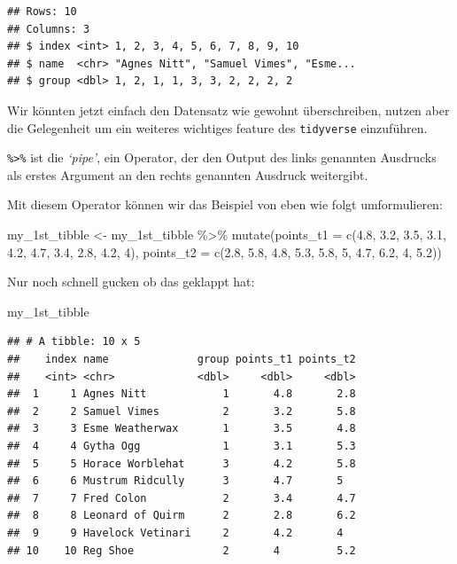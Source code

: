 \documentclass[
]{book}
\newenvironment{Shaded}{\begin{snugshade}}{\end{snugshade}}
\newcommand{\AttributeTok}[1]{\textcolor[rgb]{0.77,0.63,0.00}{#1}}
\newcommand{\DecValTok}[1]{\textcolor[rgb]{0.00,0.00,0.81}{#1}}
\newcommand{\FloatTok}[1]{\textcolor[rgb]{0.00,0.00,0.81}{#1}}
\newcommand{\FunctionTok}[1]{\textcolor[rgb]{0.00,0.00,0.00}{#1}}
\newcommand{\NormalTok}[1]{#1}
\newcommand{\OtherTok}[1]{\textcolor[rgb]{0.56,0.35,0.01}{#1}}
\newcommand{\SpecialCharTok}[1]{\textcolor[rgb]{0.00,0.00,0.00}{#1}}
\begin{document}
\begin{verbatim}
## Rows: 10
## Columns: 3
## $ index <int> 1, 2, 3, 4, 5, 6, 7, 8, 9, 10
## $ name  <chr> "Agnes Nitt", "Samuel Vimes", "Esme...
## $ group <dbl> 1, 2, 1, 1, 3, 3, 2, 2, 2, 2
\end{verbatim}

Wir könnten jetzt einfach den Datensatz wie gewohnt überschreiben, nutzen aber die Gelegenheit um ein weiteres wichtiges feature des \texttt{tidyverse} einzuführen.

\texttt{\%\textgreater{}\%} ist die \emph{`pipe'}, ein Operator, der den Output des links genannten Ausdrucks als erstes Argument an den rechts genannten Ausdruck weitergibt.

Mit diesem Operator können wir das Beispiel von eben wie folgt umformulieren:

\begin{Shaded}
\begin{Highlighting}[]
\NormalTok{my\_1st\_tibble }\OtherTok{\textless{}{-}}\NormalTok{ my\_1st\_tibble }\SpecialCharTok{\%\textgreater{}\%} 
  \FunctionTok{mutate}\NormalTok{(}\AttributeTok{points\_t1 =} \FunctionTok{c}\NormalTok{(}\FloatTok{4.8}\NormalTok{, }\FloatTok{3.2}\NormalTok{, }\FloatTok{3.5}\NormalTok{, }\FloatTok{3.1}\NormalTok{, }\FloatTok{4.2}\NormalTok{, }\FloatTok{4.7}\NormalTok{, }\FloatTok{3.4}\NormalTok{, }\FloatTok{2.8}\NormalTok{, }\FloatTok{4.2}\NormalTok{, }\DecValTok{4}\NormalTok{),}
         \AttributeTok{points\_t2 =} \FunctionTok{c}\NormalTok{(}\FloatTok{2.8}\NormalTok{, }\FloatTok{5.8}\NormalTok{, }\FloatTok{4.8}\NormalTok{, }\FloatTok{5.3}\NormalTok{, }\FloatTok{5.8}\NormalTok{, }\DecValTok{5}\NormalTok{, }\FloatTok{4.7}\NormalTok{, }\FloatTok{6.2}\NormalTok{, }\DecValTok{4}\NormalTok{, }\FloatTok{5.2}\NormalTok{))}
\end{Highlighting}
\end{Shaded}

Nur noch schnell gucken ob das geklappt hat:

\begin{Shaded}
\begin{Highlighting}[]
\NormalTok{my\_1st\_tibble}
\end{Highlighting}
\end{Shaded}

\begin{verbatim}
## # A tibble: 10 x 5
##    index name              group points_t1 points_t2
##    <int> <chr>             <dbl>     <dbl>     <dbl>
##  1     1 Agnes Nitt            1       4.8       2.8
##  2     2 Samuel Vimes          2       3.2       5.8
##  3     3 Esme Weatherwax       1       3.5       4.8
##  4     4 Gytha Ogg             1       3.1       5.3
##  5     5 Horace Worblehat      3       4.2       5.8
##  6     6 Mustrum Ridcully      3       4.7       5  
##  7     7 Fred Colon            2       3.4       4.7
##  8     8 Leonard of Quirm      2       2.8       6.2
##  9     9 Havelock Vetinari     2       4.2       4  
## 10    10 Reg Shoe              2       4         5.2
\end{verbatim}
\end{document}
